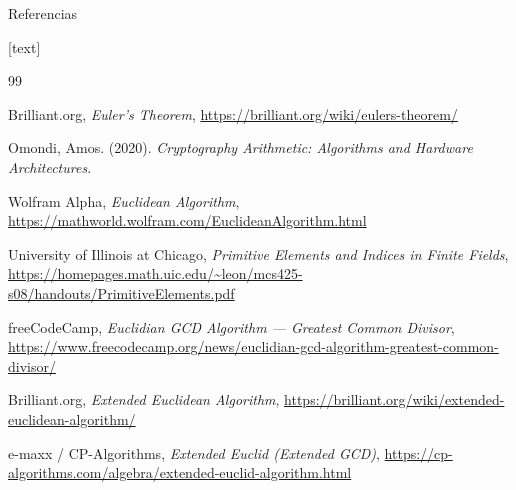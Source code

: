 \documentclass[aspectratio=169]{beamer}
\begin{document}
\begin{frame}[allowframebreaks]{Referencias}
\scriptsize
\raggedright

[text]
\renewcommand{\theromanbib}{\Roman{romanbib}}
\makeatletter
\makeatother

\begin{thebibliography}{99}

Brilliant.org, \textit{Euler's Theorem}, \url{https://brilliant.org/wiki/eulers-theorem/}

Omondi, Amos. (2020). \textit{Cryptography Arithmetic: Algorithms and Hardware Architectures}.

Wolfram Alpha, \textit{Euclidean Algorithm}, \url{https://mathworld.wolfram.com/EuclideanAlgorithm.html}

University of Illinois at Chicago, \textit{Primitive Elements and Indices in Finite Fields}, 
\url{https://homepages.math.uic.edu/~leon/mcs425-s08/handouts/PrimitiveElements.pdf}

freeCodeCamp, \textit{Euclidian GCD Algorithm — Greatest Common Divisor}, \url{https://www.freecodecamp.org/news/euclidian-gcd-algorithm-greatest-common-divisor/}

Brilliant.org, \textit{Extended Euclidean Algorithm}, \url{https://brilliant.org/wiki/extended-euclidean-algorithm/}

e-maxx / CP-Algorithms, \textit{Extended Euclid (Extended GCD)}, \url{https://cp-algorithms.com/algebra/extended-euclid-algorithm.html}


\end{thebibliography}
\end{frame}
\end{document}
